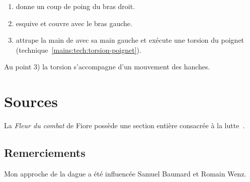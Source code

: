 \begin{technique}

	\begin{enumerate}
		\item \A donne un coup de poing du bras droit.
		
		\item \D esquive et couvre avec le bras gauche.
		
		\item \D attrape la main de \A avec sa main gauche et exécute une torsion du poignet (technique~\ref{mains:tech:torsion-poignet}).
	\end{enumerate}

	Au point 3) la torsion s'accompagne d'un mouvement des hanches.
\end{technique}


\section{Sources}


La \emph{Fleur du combat} de Fiore possède une section entière consacrée à la lutte~\cite{deiLiberi:Conan:2013:FleurCombat:Lutte}.


\subsection*{Remerciements}


Mon approche de la dague a été influencée Samuel Baumard et Romain Wenz.
